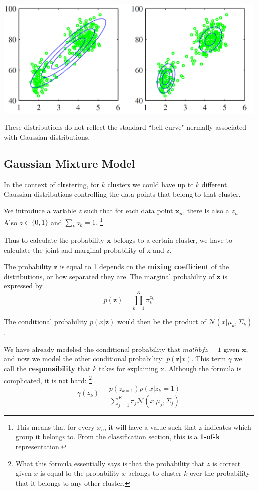 \documentclass{tufte-handout}
\begin{document}
	\begin{marginfigure}
			\includegraphics[scale=0.3]{gaussian}
			\caption{These distributions do not reflect the standard ``bell curve" normally associated with 
				Gaussian distributions.}
	\end{marginfigure}

	\subsection{Gaussian Mixture Model}
	In the context of clustering, for $k$ clusters we could have up to $k$ different Gaussian distributions 
		controlling the data points that belong to that cluster.

	We introduce a variable $z$ such that for each data point $\mathbf{x}_{n}$, there is also a $z_{n}$. 
	Also $z\in\{0,1\}$ and $\sum_{k}^{} z_{k}= 1$. 
	\footnote{This means that for every $x_{n}$, it will have a value such that z indicates which group it
		belongs to. From the classification section, this is a \textbf{1-of-k} representation.}

	Thus to calculate the probability $\mathbf{x}$ belongs to a certain cluster, we have to calculate the 
	joint and marginal probability of x and z. 

	The probability $\mathbf{z}$ is equal to 1 depends on the \textbf{mixing coefficient} of the distributions,
	or how separated they are. 
	The marginal probability of $\mathbf{z}$ is expressed by
	\[ p(\mathbf{z}) = \prod_{k=1}^{K}\pi^{z_{k}}_{k}\]
	
	The conditional probability $p(x|\mathbf{z})$ would then be the product of 
		$\mathcal{N}(x|\mu_{k},\Sigma_{k})$.

	We have already modeled the conditional probability that $mathbf{z} = 1$ given $\mathbf{x}$, and now
		we model the other conditional probability: $p(\mathbf{z}|x)$.
	This term $\gamma$ we call the \textbf{responsibility} that $k$ takes for explaining x. 
	Although the formula is complicated, it is not hard:
	\footnote{What this formula essentially says is that the probability that $z$ is correct given $x$
		is equal to the probability $x$ belongs to cluster $k$ over the probability that it belongs
		to any other cluster.
	}
	\[ \gamma(z_{k}) = \frac{p(z_{k = 1})p(x|z_{k} = 1)}
		{\sum_{j = 1}^{K}\pi_{j}\mathcal{N}(x|\mu_{j},\Sigma_{j})}
	\]
\end{document}
